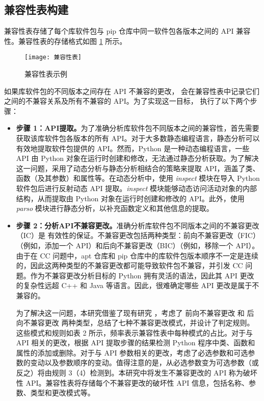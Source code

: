 \subsection{兼容性表构建}\label{4.1.3}
兼容性表存储了每个库软件包与 pip 仓库中同一软件包各版本之间的 API 兼容性。兼容性表的存储格式如图 \ref{fig:compatibility} 所示。
\begin{figure}[htbp] %
	\centering
	\texttt{[image: 兼容性表]}
	\caption{兼容性表示例}
	\label{fig:compatibility}
\end{figure}如果库软件包的不同版本之间存在 API 不兼容的更改，\tool{} 会在兼容性表中记录它们之间的不兼容关系及所有不兼容的 API。为了实现这一目标，\tool{} 执行了以下两个步骤：
\begin{itemize}
	\item \textbf{步骤 1：API提取。}为了准确分析库软件包不同版本之间的兼容性，首先需要获取该库软件包各版本的所有 API。对于大多数静态编程语言，静态分析可以有效地提取软件包提供的 API。然而，Python 是一种动态编程语言，一些 API 由 Python 对象在运行时创建和修改，无法通过静态分析获取。为了解决这一问题，\tool{}采用了动态分析与静态分析相结合的策略来提取 API，涵盖了类、函数（及其参数）和属性等。在动态分析中，\tool{}使用 \textit{inspect} 模块在导入 Python 软件包后进行反射动态 API 提取。\textit{inspect} 模块能够动态访问活动对象的内部结构，从而提取由 Python 对象在运行时创建和修改的 API。此外，\tool{}使用 \textit{parso}  模块进行静态分析，以补充函数定义和其他信息的提取。
	
	
	\item \textbf{步骤 2：分析API不兼容更改。}准确分析库软件包不同版本之间的不兼容更改（IC）是 \tool{}有效性的保证。不兼容更改包括两种类型：前向不兼容更改（FIC）（例如，添加一个 API）和后向不兼容更改（BIC）（例如，移除一个 API）。由于在 CC 问题中，apt 仓库和 pip 仓库中的库软件包版本顺序不一定是连续的，因此这两种类型的不兼容更改都可能导致软件包不兼容，并引发 CC 问题。作为不兼容更改分析目标的 Python 拥有灵活的语法，因此其 API 更改的复杂性远超 C++ 和 Java 等语言。因此，很难确定哪些 API 更改是属于不兼容的。
	
	为了解决这一问题，本研究借鉴了现有研究 \cite{zhang2020python}，考虑了 前向不兼容更改 和 后向不兼容更改 两种类型，总结了七种不兼容更改模式，并设计了判定规则。这些模式和规则如表 2 所示，频率表示兼容性表中每种模式的占比。对于与 API 相关的更改，\tool{}根据 API 提取步骤的结果检测 Python 程序中类、函数和属性的添加或删除。对于与 API 参数相关的更改，\tool{}考虑了必选参数和可选参数的变动以及参数顺序的变动。值得注意的是，从必选参数变为可选参数（或反之）将由规则 3（4）检测到。本研究中将发生不兼容更改的 API 称为破坏性 API。兼容性表将存储每个不兼容更改的破坏性 API 信息，包括名称、参数、类型和更改模式等。

\end{itemize}

